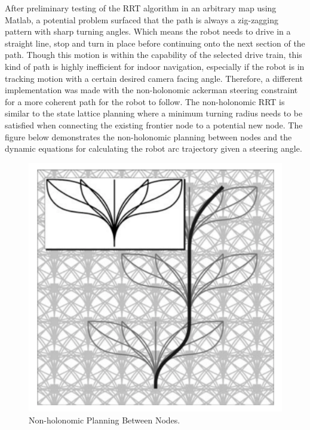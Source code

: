 \documentclass[11pt]{article}
\begin{document}
After preliminary testing of the RRT algorithm in an arbitrary map using Matlab, a potential problem surfaced that the path is always a zig-zagging pattern with sharp turning angles. Which means the robot needs to drive in a straight line, stop and turn in place before continuing onto the next section of the path. Though this motion is within the capability of the selected drive train, this kind of path is highly inefficient for indoor navigation, especially if the robot is in tracking motion with a certain desired camera facing angle. Therefore, a different implementation was made with the non-holonomic ackerman steering constraint for a more coherent path for the robot to follow. 
The non-holonomic RRT is similar to the state lattice planning where a minimum turning radius needs to be satisfied when connecting the existing frontier node to a potential new node. The figure below demonstrates the non-holonomic planning between nodes and the dynamic equations for calculating the robot arc trajectory given a steering angle.

\begin{figure}[H]
    \centering
        \includegraphics[scale=.3, angle =0]{figures/rrt-2.png}
    \caption{Non-holonomic Planning Between Nodes.}
    \label{Non-holonomic Planning Between Nodes.}
\end{figure}
\end{document}
